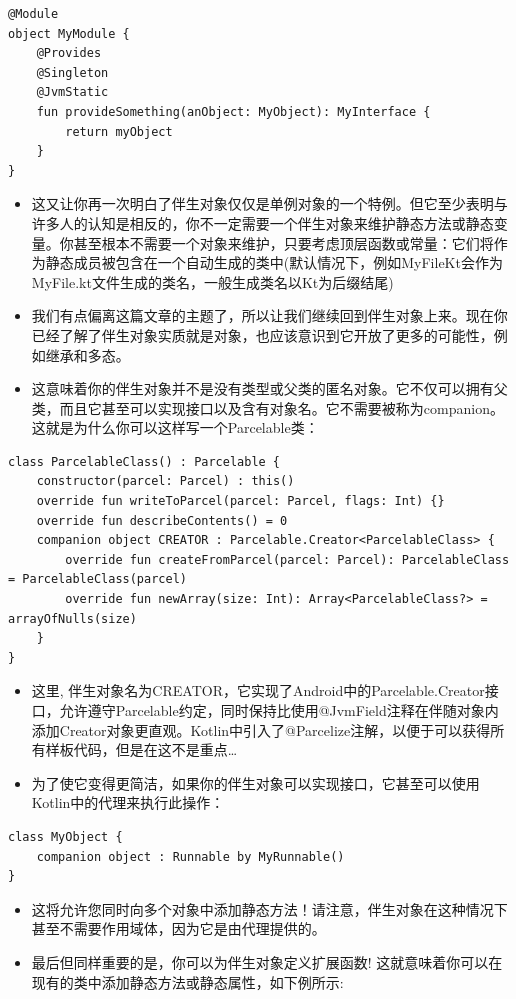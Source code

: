\documentclass[9pt, b5paper]{article}
\begin{document}
\begin{verbatim}
@Module
object MyModule {
    @Provides
    @Singleton
    @JvmStatic
    fun provideSomething(anObject: MyObject): MyInterface {
        return myObject
    }
}
\end{verbatim}
\begin{itemize}
\item 这又让你再一次明白了伴生对象仅仅是单例对象的一个特例。但它至少表明与许多人的认知是相反的，你不一定需要一个伴生对象来维护静态方法或静态变量。你甚至根本不需要一个对象来维护，只要考虑顶层函数或常量：它们将作为静态成员被包含在一个自动生成的类中(默认情况下，例如MyFileKt会作为MyFile.kt文件生成的类名，一般生成类名以Kt为后缀结尾)
\item 我们有点偏离这篇文章的主题了，所以让我们继续回到伴生对象上来。现在你已经了解了伴生对象实质就是对象，也应该意识到它开放了更多的可能性，例如继承和多态。
\item 这意味着你的伴生对象并不是没有类型或父类的匿名对象。它不仅可以拥有父类，而且它甚至可以实现接口以及含有对象名。它不需要被称为companion。这就是为什么你可以这样写一个Parcelable类：
\end{itemize}
\begin{verbatim}
class ParcelableClass() : Parcelable {
    constructor(parcel: Parcel) : this()
    override fun writeToParcel(parcel: Parcel, flags: Int) {}
    override fun describeContents() = 0
    companion object CREATOR : Parcelable.Creator<ParcelableClass> {
        override fun createFromParcel(parcel: Parcel): ParcelableClass = ParcelableClass(parcel)
        override fun newArray(size: Int): Array<ParcelableClass?> = arrayOfNulls(size)
    }
}
\end{verbatim}
\begin{itemize}
\item 这里, 伴生对象名为CREATOR，它实现了Android中的Parcelable.Creator接口，允许遵守Parcelable约定，同时保持比使用@JvmField注释在伴随对象内添加Creator对象更直观。Kotlin中引入了@Parcelize注解，以便于可以获得所有样板代码，但是在这不是重点\ldots{}
\item 为了使它变得更简洁，如果你的伴生对象可以实现接口，它甚至可以使用Kotlin中的代理来执行此操作：
\end{itemize}
\begin{verbatim}
class MyObject {
    companion object : Runnable by MyRunnable()
}
\end{verbatim}
\begin{itemize}
\item 这将允许您同时向多个对象中添加静态方法！请注意，伴生对象在这种情况下甚至不需要作用域体，因为它是由代理提供的。
\item 最后但同样重要的是，你可以为伴生对象定义扩展函数! 这就意味着你可以在现有的类中添加静态方法或静态属性，如下例所示:
\end{itemize}
\end{document}
